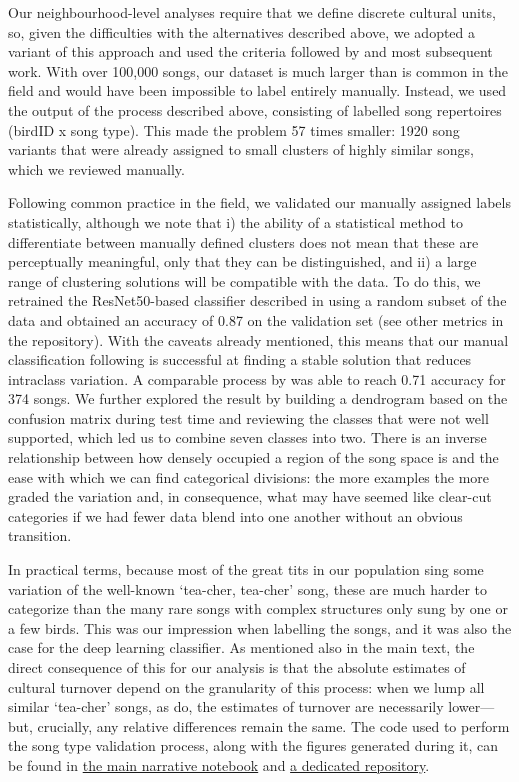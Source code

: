 Our neighbourhood-level analyses require that we define discrete cultural units, so, given the difficulties with the alternatives described above, we adopted a variant of this approach and used the criteria followed by \textcite{mcgregor1982b} and most subsequent work. With over 100,000 songs, our dataset is much larger than is common in the field and would have been impossible to label entirely manually. Instead, we used the output of the process described above, consisting of labelled song repertoires (birdID x song type). This made the problem 57 times smaller: 1920 song variants that were already assigned to small clusters of highly similar songs, which we reviewed manually.

Following common practice in the field, we validated our manually assigned labels statistically, although we note that i) the ability of a statistical method to differentiate between manually defined clusters does not mean that these are perceptually meaningful, only that they can be distinguished, and ii) a large range of clustering solutions will be compatible with the data. To do this, we retrained the ResNet50-based classifier described in \textcite{merinorecalde2023} using a random subset of the data and obtained an accuracy of 0.87 on the validation set (see other metrics in the repository). With the caveats already mentioned, this means that our manual classification following \textcite{mcgregor1982b} is successful at finding a stable solution that reduces intraclass variation. A comparable process by \textcite{fayet2014} was able to reach 0.71 accuracy for 374 songs. We further explored the result by building a dendrogram based on the confusion matrix during test time and reviewing the classes that were not well supported, which led us to combine seven classes into two. There is an inverse relationship between how densely occupied a region of the song space is and the ease with which we can find categorical divisions: the more examples the more graded the variation and, in consequence, what may have seemed like clear-cut categories if we had fewer data blend into one another without an obvious transition.

In practical terms, because most of the great tits in our population sing some variation of the well-known ‘tea-cher, tea-cher' song, these are much harder to categorize than the many rare songs with complex structures only sung by one or a few birds. This was our impression when labelling the songs, and it was also the case for the deep learning classifier. As mentioned also in the main text, the direct consequence of this for our analysis is that the absolute estimates of cultural turnover depend on the granularity of this process: when we lump all similar ‘tea-cher' songs, as \textcite{mcgregor1982b} do, the estimates of turnover are necessarily lower---but, crucially, any relative differences remain the same.
The code used to perform the song type validation process, along with the figures generated during it, can be found in \href{https://github.com/nilomr/wytham-songtype-validation/blob/main/notebooks/4_train-model.ipynb}{the main narrative notebook} and \href{https://github.com/nilomr/wytham-songtype-validation}{a dedicated repository}.

